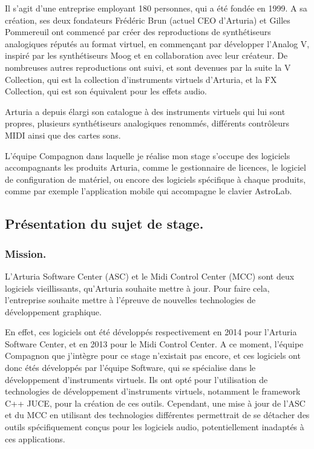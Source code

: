 \documentclass[francais]{rapportPFE}  %
\begin{document}
Il s'agit d'une entreprise employant 180 personnes, qui a été fondée en 1999. A sa création, ses deux fondateurs Frédéric Brun (actuel CEO d'Arturia) et Gilles Pommereuil ont commencé par créer des reproductions de synthétiseurs analogiques réputés au format virtuel, en commençant par développer l'Analog V, inspiré par les synthétiseurs Moog et en collaboration avec leur créateur. De nombreuses autres reproductions ont suivi, et sont devenues par la suite la V Collection, qui est la collection d'instruments virtuels d'Arturia, et la FX Collection, qui est son équivalent pour les effets audio.

Arturia a depuis élargi son catalogue à des instruments virtuels qui lui sont propres, plusieurs synthétiseurs analogiques renommés, différents contrôleurs MIDI ainsi que des cartes sons. 

L’équipe Compagnon dans laquelle je réalise mon stage s’occupe des logiciels accompagnants les produits Arturia, comme le gestionnaire de licences, le logiciel de configuration de matériel, ou encore des logiciels spécifique à chaque produits, comme par exemple l'application mobile qui accompagne le clavier AstroLab. 

\subsection{Présentation du sujet de stage.}


\subsubsection{Mission.}

L'Arturia Software Center (ASC) et le Midi Control Center (MCC) sont deux logiciels vieillissants, qu'Arturia souhaite mettre à jour. Pour faire cela, l'entreprise souhaite mettre à l'épreuve de nouvelles technologies de développement graphique.

En effet, ces logiciels ont été développés respectivement en 2014 pour l'Arturia Software Center, et en 2013 pour le Midi Control Center. A ce moment, l'équipe Compagnon que j'intègre pour ce stage n'existait pas encore, et ces logiciels ont donc étés développés par l'équipe Software, qui se spécialise dans le développement d'instruments virtuels. Ils ont opté pour l'utilisation de technologies de développement d'instruments virtuels, notamment le framework C++ JUCE, pour la création de ces outils. Cependant, une mise à jour de l'ASC et du MCC en utilisant des technologies différentes permettrait de se détacher des outils spécifiquement conçus pour les logiciels audio, potentiellement inadaptés à ces applications.
\end{document}
